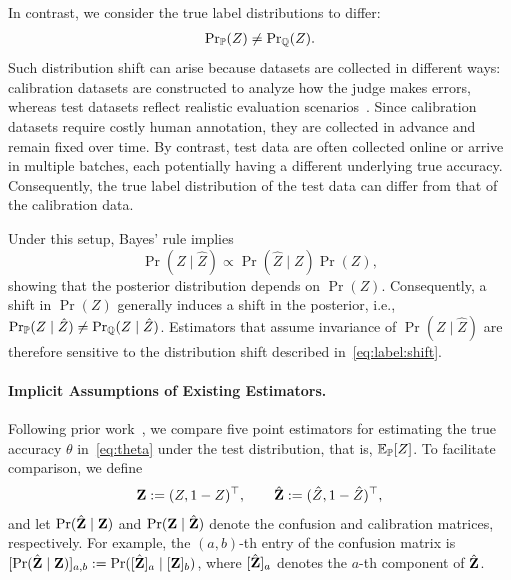 In contrast, we consider the true label distributions to differ:
\begin{align}
    \label{eq:label:shift}
    \mathop{\rm Pr}\nolimits_{{\mathbb{P}}}(Z)\neq\mathop{\rm Pr}\nolimits_{{\mathbb{Q}}}(Z).
\end{align}
Such distribution shift can arise because datasets are collected in different ways: calibration datasets are constructed to analyze how the judge makes errors, whereas test datasets reflect realistic evaluation scenarios~\citep{jung2024trust}. Since calibration datasets require costly human annotation, they are collected in advance and remain fixed over time. By contrast, test data are often collected online or arrive in multiple batches, each potentially having a different underlying true accuracy. Consequently, the true label distribution of the test data can differ from that of the calibration data.

Under this setup, Bayes’ rule implies
\begin{equation}
\label{eq:bayes}
    \Pr(Z \mid \hat Z) \propto \Pr(\hat Z \mid Z)\Pr(Z),
\end{equation}
showing that the posterior distribution depends on $\Pr(Z)$. Consequently, a shift in $\Pr(Z)$ generally induces a shift in the posterior, i.e., $\mathop{\rm Pr}\nolimits_{{\mathbb{P}}}(Z \mid \hat Z) \neq \mathop{\rm Pr}\nolimits_{{\mathbb{Q}}}(Z \mid \hat Z)$. Estimators that assume invariance of $\Pr(Z \mid \hat Z)$ are therefore sensitive to the distribution shift described in~\eqref{eq:label:shift}.


\paragraph{Implicit Assumptions of Existing Estimators.}

Following prior work~\citep{kloos2021comparing, meertens2022improving}, we compare five point estimators for estimating the true accuracy $\theta$ in~\eqref{eq:theta} under the test distribution, that is, $\displaystyle \mathbb{E}_{{\mathbb{P}}}[Z]$.
To facilitate comparison, we define
\begin{align}
    {\mathbf{Z}} := (Z, 1-Z)^\top,
    \qquad
    \hat{{\mathbf{Z}}} := (\hat Z, 1-\hat Z)^\top,
\end{align}
and let $\mathop{\rm Pr}\nolimits(\hat{{\mathbf{Z}}} \mid {\mathbf{Z}})$ and $\mathop{\rm Pr}\nolimits({\mathbf{Z}} \mid \hat{{\mathbf{Z}}})$ denote the confusion and calibration matrices, respectively.
For example, the $(a,b)$-th entry of the confusion matrix is $[\mathop{\rm Pr}\nolimits(\hat{{\mathbf{Z}}} \mid {\mathbf{Z}})]_{a,b} := \mathop{\rm Pr}\nolimits([\hat{{\mathbf{Z}}}]_a \mid [{\mathbf{Z}}]_b)$, where $[\hat{{\mathbf{Z}}}]_a$ denotes the $a$-th component of $\hat{{\mathbf{Z}}}$.



